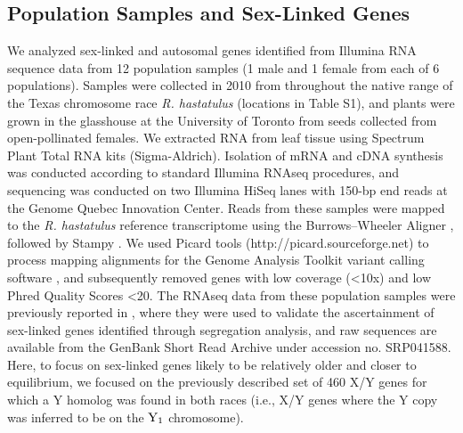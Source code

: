 \documentclass[9pt,twocolumn,twoside,lineno]{gsajnl}
\begin{document}
\subsection*{Population Samples and Sex-Linked Genes}
We analyzed sex-linked and autosomal genes identified from Illumina RNA sequence data from 12 population samples (1 male and 1 female from each of 6 populations). Samples were collected in 2010 from throughout the native range of the Texas chromosome race \textit{R. hastatulus} (locations in Table S1), and plants were grown in the glasshouse at the University of Toronto from seeds collected from open-pollinated females. We extracted RNA from leaf tissue using Spectrum Plant Total RNA kits (Sigma-Aldrich). Isolation of mRNA and cDNA synthesis was conducted according to standard Illumina RNAseq procedures, and sequencing was conducted on two Illumina HiSeq lanes with 150-bp end reads at the Genome Quebec Innovation Center. Reads from these samples were mapped to the \textit{R. hastatulus} reference transcriptome \citep{hough2014} using the Burrows–Wheeler Aligner \citep{li2010fast}, followed by Stampy \citep{lunter2011stampy}. We used Picard tools (http://picard.sourceforge.net) to process mapping alignments for the Genome Analysis Toolkit variant calling software \citep{mckenna2010genome}, and subsequently removed genes with low coverage (<10x) and low Phred Quality Scores <20. The RNAseq data from these population samples were previously reported in \citet{hough2014}, where they were used to validate the ascertainment of sex-linked genes identified through segregation analysis, and raw sequences are available from the GenBank Short Read Archive under accession no. SRP041588. Here, to focus on sex-linked genes likely to be relatively older and closer to equilibrium, we focused on the previously described set of 460 X/Y genes for which a Y homolog was found in both races (i.e., X/Y genes where the Y copy was inferred to be on the $\textnormal{Y}_\textnormal{1}$ chromosome).
\end{document}
